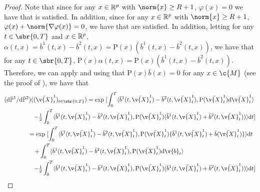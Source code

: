 \begin{proof}
	Note that since for any \(x \in \mathbb{R}^p\) with \(\norm{x} \geq R+1\), \(\varphi(x) = 0\) we have that \cite[Equation (7.137)]{lipster2001statistics} is satisfied.
	In addition, since for any \(x \in \mathbb{R}^p\) with \(\norm{x} \geq R+1\), \(\varphi(x) + \norm{\nabla \varphi(x)}= 0\), we have that \cite[Equation (4.110), Equation (4.111)]{lipster2001statistics} are satisfied.
	In addition, letting for any \(t \in \sbr{0,T}\) and \(x \in \mathbb{R}^p\), \(\alpha(t,x) = \bar{b}^1(t, x) - \bar{b}^2(t, x) = \mathrm{P}(x) (\bar{b}^1(t, x) - \bar{b}^2(t, x))\), we have that for any \(t \in \sbr{0,T}\), \(\mathrm{P}(x) \alpha(t,x) = \mathrm{P}(x)(\bar{b}^1(t, x) - \bar{b}^2(t, x))\).
	Therefore, we can apply \cite[Section 7.6.4]{lipster2001statistics} and using that \(\mathrm{P}(x) \bar{b}(x) = 0\) for any \(x \in \c{M}\) (see the proof of ), we have that \begin{align}  & (\mathrm{d} \bar{\bb{P}}^1 / \mathrm{d} \bar{\bb{P}}^2)((\bar{\v{X}}_t^1)_{t \in \sbr{0,T}}) ={ \exp\left.
              [\int_0^T \langle \bar{b}^1(t, \bar{\v{X}}_t^1) - \bar{b}^2(t, \bar{\v{X}}_t^1), \mathrm{P}(\bar{\v{X}}_t^1) \mathrm{d} \bar{\v{X}}_t^1 \rangle \right. }                                                                                                                                  \\
               & \qquad \qquad  \quad  { - \tfrac{1}{2} \int_0^T \langle \bar{b}^1(t, \bar{\v{X}}_t^1) - \bar{b}^2(t, \bar{\v{X}}_t^1), \mathrm{P}(\bar{\v{X}}_t^1)(\bar{b}^1(t, \bar{\v{X}}_t^1) + \bar{b}^2(t, \bar{\v{X}}_t^1)) \rangle  \mathrm{d} t ] }                                   \\
               & \qquad \qquad ={ \exp\left.[\int_0^T \langle \bar{b}^1(t, \bar{\v{X}}_t^1)  - \bar{b}^2(t, \bar{\v{X}}_t^1), \mathrm{P}(\bar{\v{X}}_t^1) \{\bar{b}^1(t, \bar{\v{X}}_t^1) + \bar{b}(\bar{\v{X}}_t^1)\} \rangle \mathrm{d} t \right.}                                           \\
               & \qquad \qquad  \quad { \left. + \int_0^T \langle \bar{b}^1(t, \bar{\v{X}}_t^1) - \bar{b}^2(t, \bar{\v{X}}_t^1), \mathrm{P}(\bar{\v{X}}_t^1) \mathrm{d} \v{b}_t \rangle\right. }                                                                                               \\
               & \qquad \qquad  \quad  { - \tfrac{1}{2} \int_0^T \langle \bar{b}^1(t, \bar{\v{X}}_t^1) - \bar{b}^2(t, \bar{\v{X}}_t^1), \mathrm{P}(\bar{\v{X}}_t^1)(\bar{b}^1(t, \bar{\v{X}}_t^1) + \bar{b}^2(t, \bar{\v{X}}_t^1)) \rangle  \mathrm{d} t ] }                                   \\

\end{align}
\end{proof}
